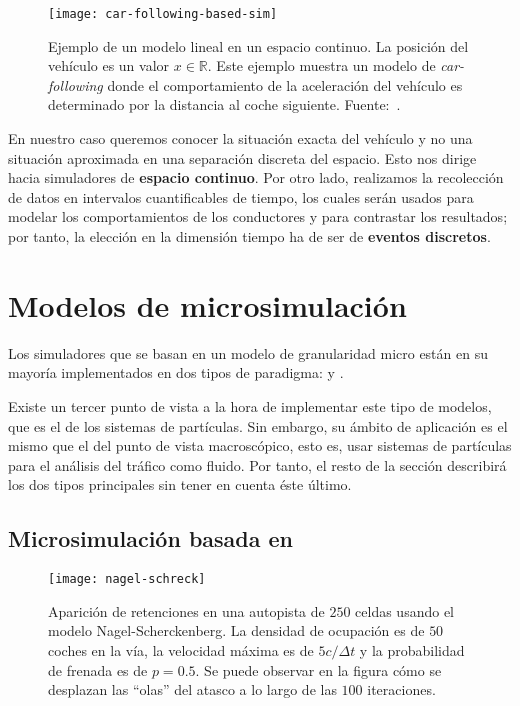 \begin{figure*}[t]
	\centering
	\texttt{[image: car-following-based-sim]}
	\caption[Ejemplo de modelo lineal en un espacio continuo]{Ejemplo de un modelo lineal en un espacio continuo. La posición del vehículo es un valor $x \in \mathbb{R}$. Este ejemplo muestra un modelo de \textit{car-following} donde el comportamiento de la aceleración del vehículo es determinado por la distancia al coche siguiente. Fuente:~\cite{Tordeux2011}.}
	\label{fig:car-following-based-sim}
\end{figure*}

En nuestro caso queremos conocer la situación exacta del vehículo y no una situación aproximada en una separación discreta del espacio. Esto nos dirige hacia simuladores de \textbf{espacio continuo}. Por otro lado, realizamos la recolección de datos en intervalos cuantificables de tiempo, los cuales serán usados para modelar los comportamientos de los conductores y para contrastar los resultados; por tanto, la elección en la dimensión tiempo ha de ser de \textbf{eventos discretos}.

\section{Modelos de microsimulación}

Los simuladores que se basan en un modelo de granularidad micro están en su mayoría implementados en dos tipos de paradigma:  y .

Existe un tercer punto de vista a la hora de implementar este tipo de modelos, que es el de los sistemas de partículas. Sin embargo, su ámbito de aplicación es el mismo que el del punto de vista macroscópico, esto es, usar sistemas de partículas para el análisis del tráfico como fluido. Por tanto, el resto de la sección describirá los dos tipos principales sin tener en cuenta éste último.

\subsection{Microsimulación basada en }

\begin{figure}[t]
	\centering
	\texttt{[image: nagel-schreck]}
	\caption[Ejemplo de efecto de ondas de choque en simulación de tipo Nagel-Scherckenberg]{Aparición de retenciones en una autopista de $250$ celdas usando el modelo Nagel-Scherckenberg. La densidad de ocupación es de $50$ coches en la vía, la velocidad máxima es de $5 c/\Delta t$ y la probabilidad de frenada es de $p = 0.5$. Se puede observar en la figura cómo se desplazan las \enquote{olas} del atasco a lo largo de las $100$ iteraciones.}
	\label{fig:nagel-schreck}
\end{figure}

